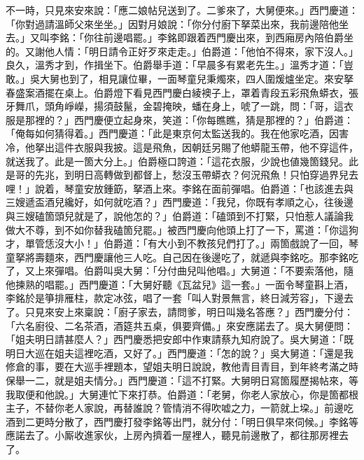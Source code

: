 不一時，只見來安來說：「應二娘帖兒送到了。二爹來了，大舅便來。」西門慶道：「你對過請溫師父來坐坐。」因對月娘說：「你分付廚下拏菜出來，我前邊陪他坐去。」又叫李銘：「你往前邊唱罷。」李銘即跟着西門慶出來，到西廂房內陪伯爵坐的。又謝他人情：「明日請令正好歹來走走。」伯爵道：「他怕不得來，家下沒人。」良久，溫秀才到，作揖坐下。伯爵舉手道：「早晨多有累老先生。」溫秀才道：「豈敢。」吳大舅也到了，相見讓位畢，一面琴童兒秉燭來，四人圍煖爐坐定。來安拏春盛案酒擺在桌上。伯爵燈下看見西門慶白綾襖子上，罩着青段五彩飛魚蟒衣，張牙舞爪，頭角崢嶸，揚須鼓鬣，金碧掩映，蟠在身上，唬了一跳，問：「哥，這衣服是那裡的？」西門慶便立起身來，笑道：「你每瞧瞧，猜是那裡的？」伯爵道：「俺每如何猜得着。」西門慶道：「此是東京何太監送我的。{}我在他家吃酒，因害冷，他拏出這件衣服與我披。這是飛魚，因朝廷另賜了他蟒龍玉帶，他不穿這件，就送我了。此是一箇大分上。」伯爵極口誇道：「這花衣服，少說也値幾箇錢兒。此是哥的先兆，到明日高轉做到都督上，愁沒玉帶蟒衣？何況飛魚！只怕穿過界兒去哩！」{}說着，琴童安放鍾筯，拏酒上來。李銘在面前彈唱。伯爵道：「也該進去與三嫂遞盃酒兒纔好，如何就吃酒？」西門慶道：「我兒，你既有孝順之心，往後邊與三嫂磕箇頭兒就是了，說他怎的？」伯爵道：「磕頭到不打緊，只怕惹人議論我做大不尊，到不如你替我磕箇兒罷。」被西門慶向他頭上打了一下，罵道：「你這狗才，單管恁沒大小！」伯爵道：「有大小到不教孩兒們打了。」兩箇戲說了一回，琴童拏將壽麵來，西門慶讓他三人吃。自己因在後邊吃了，就遞與李銘吃。那李銘吃了，又上來彈唱。伯爵叫吳大舅：「分付曲兒叫他唱。」大舅道：「不要索落他，隨他揀熟的唱罷。」西門慶道：「大舅好聽《瓦盆兒》這一套。」一面令琴童斟上酒，李銘於是箏排雁柱，款定冰弦，唱了一套「叫人對景無言，終日減芳容」，下邊去了。只見來安上來稟說：「廚子家去，請問爹，明日叫幾名答應？」西門慶分付：「六名廚役、二名茶酒，酒筵共五桌，俱要齊備。」來安應諾去了。吳大舅便問：「姐夫明日請甚麼人？」西門慶悉把安郎中作東請蔡九知府說了。吳大舅道：「既明日大巡在姐夫這裡吃酒，又好了。」西門慶道：「怎的說？」吳大舅道：「還是我修倉的事，要在大巡手裡題本，望姐夫明日說說，教他青目青目，到年終考滿之時保舉一二，就是姐夫情分。」西門慶道：「這不打緊。大舅明日寫箇履歷揭帖來，等我取便和他說。」大舅連忙下來打恭。伯爵道：「老舅，你老人家放心，你是箇都根主子，不替你老人家說，再替誰說？管情消不得吹嘘之力，一箭就上垜。」{}前邊吃酒到二更時分散了，西門慶打發李銘等出門，就分付：「明日俱早來伺候。」李銘等應諾去了。小厮收進家伙，上房內擠着一屋裡人，聽見前邊散了，都往那房裡去了。

